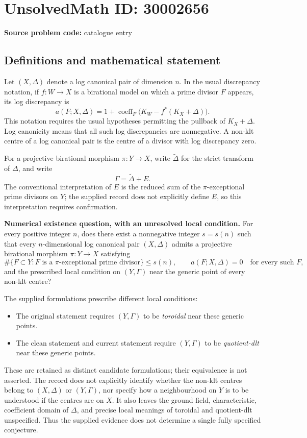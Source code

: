 \documentclass[11pt]{article}
\begin{document}
\section*{UnsolvedMath ID: 30002656}
\textbf{Source problem code:} catalogue entry
\subsection{Definitions and mathematical statement}
Let \((X,\Delta)\) denote a log canonical pair of dimension \(n\). In the usual discrepancy notation, if \(f:W\to X\) is a birational model on which a prime divisor \(F\) appears, its log discrepancy is
\[
 a(F;X,\Delta)=1+\operatorname{coeff}_{F}\bigl(K_W-f^*(K_X+\Delta)\bigr).
\]
This notation requires the usual hypotheses permitting the pullback of \(K_X+\Delta\). Log canonicity means that all such log discrepancies are nonnegative. A non-klt centre of a log canonical pair is the centre of a divisor with log discrepancy zero.

For a projective birational morphism \(\pi:Y\to X\), write \(\widetilde\Delta\) for the strict transform of \(\Delta\), and write
\[
 \Gamma=\widetilde\Delta+E.
\]
The conventional interpretation of \(E\) is the reduced sum of the \(\pi\)-exceptional prime divisors on \(Y\); the supplied record does not explicitly define \(E\), so this interpretation requires confirmation.

\textbf{Numerical existence question, with an unresolved local condition.}
For every positive integer \(n\), does there exist a nonnegative integer \(s=s(n)\) such that every \(n\)-dimensional log canonical pair \((X,\Delta)\) admits a projective birational morphism \(\pi:Y\to X\) satisfying
\[
 \#\{F\subset Y:F\text{ is a }\pi\text{-exceptional prime divisor}\}\leq s(n),
 \qquad
 a(F;X,\Delta)=0
 \quad\text{for every such }F,
\]
and the prescribed local condition on \((Y,\Gamma)\) near the generic point of every non-klt centre?

The supplied formulations prescribe different local conditions:
\begin{itemize}
\item The original statement requires \((Y,\Gamma)\) to be \emph{toroidal} near these generic points.
\item The clean statement and current statement require \((Y,\Gamma)\) to be \emph{quotient-dlt} near these generic points.
\end{itemize}
These are retained as distinct candidate formulations; their equivalence is not asserted. The record does not explicitly identify whether the non-klt centres belong to \((X,\Delta)\) or \((Y,\Gamma)\), nor specify how a neighbourhood on \(Y\) is to be understood if the centres are on \(X\). It also leaves the ground field, characteristic, coefficient domain of \(\Delta\), and precise local meanings of toroidal and quotient-dlt unspecified. Thus the supplied evidence does not determine a single fully specified conjecture.
\end{document}
